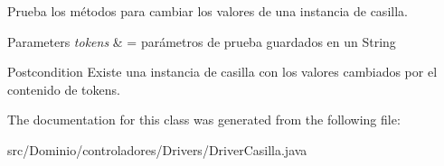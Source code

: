 Prueba los métodos para cambiar los valores de una instancia de casilla. 


\begin{DoxyParams}{Parameters}
{\em tokens} & = parámetros de prueba guardados en un String \\
\hline
\end{DoxyParams}
\begin{DoxyPostcond}{Postcondition}
Existe una instancia de casilla con los valores cambiados por el contenido de tokens. 
\end{DoxyPostcond}


The documentation for this class was generated from the following file\+:\begin{DoxyCompactItemize}
\item 
src/\+Dominio/controladores/\+Drivers/Driver\+Casilla.\+java\end{DoxyCompactItemize}
